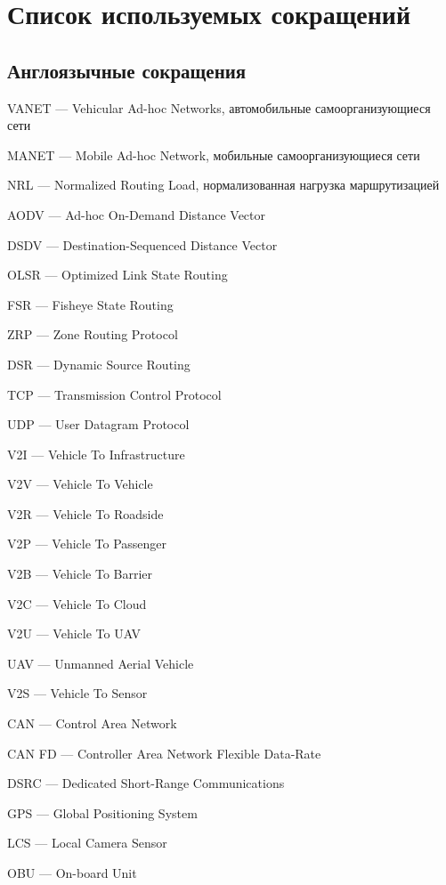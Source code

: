\chapter*{Список используемых сокращений}

\section*{Англоязычные сокращения}

\mbox{}

VANET --- Vehicular Ad-hoc Networks, автомобильные самоорганизующиеся сети

MANET --- Mobile Ad-hoc Network, мобильные самоорганизующиеся сети

NRL --- Normalized Routing Load, нормализованная нагрузка маршрутизацией

AODV --- Ad-hoc On-Demand Distance Vector

DSDV --- Destination-Sequenced Distance Vector

OLSR --- Optimized Link State Routing

FSR --- Fisheye State Routing

ZRP --- Zone Routing Protocol

DSR --- Dynamic Source Routing

TCP --- Transmission Control Protocol

UDP --- User Datagram Protocol

V2I --- Vehicle To Infrastructure

V2V --- Vehicle To Vehicle

V2R --- Vehicle To Roadside

V2P --- Vehicle To Passenger

V2B --- Vehicle To Barrier

V2C --- Vehicle To Cloud

V2U --- Vehicle To UAV

UAV --- Unmanned Aerial Vehicle

V2S --- Vehicle To Sensor

CAN --- Control Area Network

CAN FD --- Controller Area Network Flexible Data-Rate

DSRC --- Dedicated Short-Range Communications

GPS --- Global Positioning System

LCS --- Local Camera Sensor

OBU --- On-board Unit

